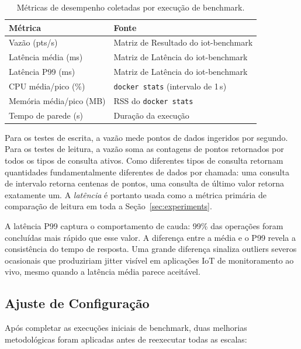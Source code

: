 \begin{table}[t]
  \centering
  \caption{Métricas de desempenho coletadas por execução de benchmark.}
  \label{tab:metrics}
  \begin{tabular}{ll}
    \hline
    \textbf{Métrica} & \textbf{Fonte} \\
    \hline
    Vazão (pts/s)            & Matriz de Resultado do iot-benchmark \\
    Latência média (ms)      & Matriz de Latência do iot-benchmark \\
    Latência P99 (ms)        & Matriz de Latência do iot-benchmark \\
    CPU média/pico (\%)      & \texttt{docker stats} (intervalo de 1\,s) \\
    Memória média/pico (MB)  & RSS do \texttt{docker stats} \\
    Tempo de parede (s)      & Duração da execução \\
    \hline
  \end{tabular}
\end{table}

Para os testes de escrita, a vazão mede pontos de dados ingeridos por segundo. Para os testes
de leitura, a vazão soma as contagens de pontos retornados por todos os tipos de consulta ativos.
Como diferentes tipos de consulta retornam quantidades fundamentalmente diferentes de dados por
chamada: uma consulta de intervalo retorna centenas de pontos, uma consulta de último valor
retorna exatamente um. A \textit{latência} é portanto usada como a métrica primária de comparação de
leitura em toda a Seção~\ref{sec:experiments}.

A latência P99 captura o comportamento de cauda: 99\% das operações foram concluídas mais
rápido que esse valor. A diferença entre a média e o P99 revela a consistência do tempo de
resposta. Uma grande diferença sinaliza outliers severos ocasionais que produziriam jitter
visível em aplicações IoT de monitoramento ao vivo, mesmo quando a latência média parece
aceitável.

\subsection{Ajuste de Configuração}
\label{sec:tuning}

Após completar as execuções iniciais de benchmark, duas melhorias metodológicas foram aplicadas
antes de reexecutar todas as escalas:

